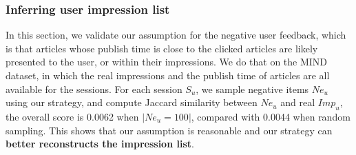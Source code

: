 \subsubsection{Inferring user impression list}
In this section, we validate our assumption for the negative user feedback,
which is that articles whose publish time is close to the clicked articles are
likely presented to the user, or within their impressions.
We do that on the MIND dataset, in which the real impressions and the
publish time of articles are all available for the sessions. 
For each session $S_u$, we sample negative items $Ne_u$ using our strategy, and compute Jaccard similarity between $Ne_u$ and real $Imp_u$, the overall score is 0.0062 when $|Ne_u=100|$, compared with 0.0044 when random sampling.
This shows that our assumption is reasonable and our strategy can \textbf{better reconstructs the impression list}.
